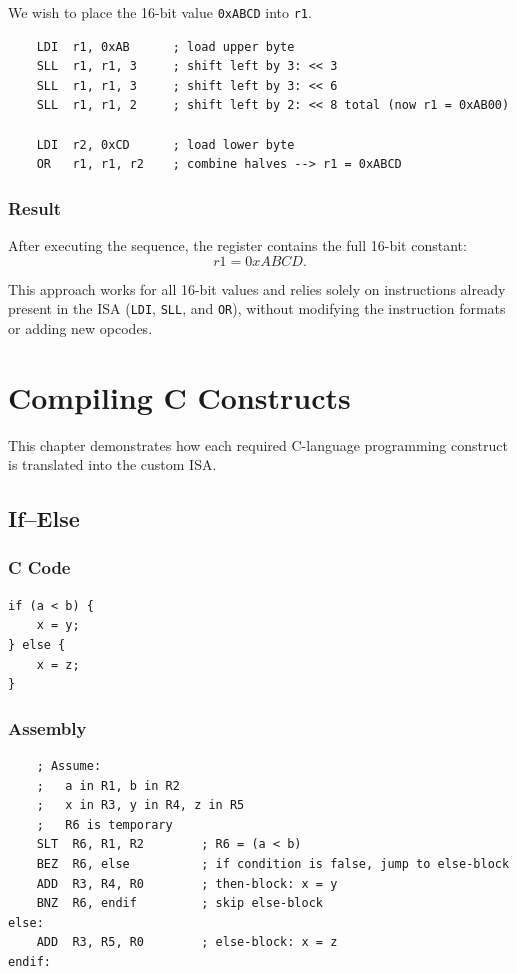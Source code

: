 \documentclass[12pt]{report}
\begin{document}
We wish to place the 16-bit value \texttt{0xABCD} into \texttt{r1}.

\begin{lstlisting}
    LDI  r1, 0xAB      ; load upper byte
    SLL  r1, r1, 3     ; shift left by 3: << 3
    SLL  r1, r1, 3     ; shift left by 3: << 6
    SLL  r1, r1, 2     ; shift left by 2: << 8 total (now r1 = 0xAB00)

    LDI  r2, 0xCD      ; load lower byte
    OR   r1, r1, r2    ; combine halves --> r1 = 0xABCD
\end{lstlisting}

\subsection*{Result}

After executing the sequence, the register contains the full 16-bit constant:
\[
    r1 = 0xABCD.
\]

This approach works for all 16-bit values and relies solely on instructions
already present in the ISA (\texttt{LDI}, \texttt{SLL}, and \texttt{OR}), without
modifying the instruction formats or adding new opcodes.

\clearpage

\chapter{Compiling C Constructs}

This chapter demonstrates how each required C-language programming construct is translated into the custom ISA.

\section{If--Else}

\subsection*{C Code}
\begin{lstlisting}
if (a < b) {
    x = y;
} else {
    x = z;
}
\end{lstlisting}

\subsection*{Assembly}
\begin{lstlisting}
    ; Assume:
    ;   a in R1, b in R2
    ;   x in R3, y in R4, z in R5
    ;   R6 is temporary
    SLT  R6, R1, R2        ; R6 = (a < b)
    BEZ  R6, else          ; if condition is false, jump to else-block
    ADD  R3, R4, R0        ; then-block: x = y
    BNZ  R6, endif         ; skip else-block
else:
    ADD  R3, R5, R0        ; else-block: x = z
endif:
\end{lstlisting}
\end{document}
